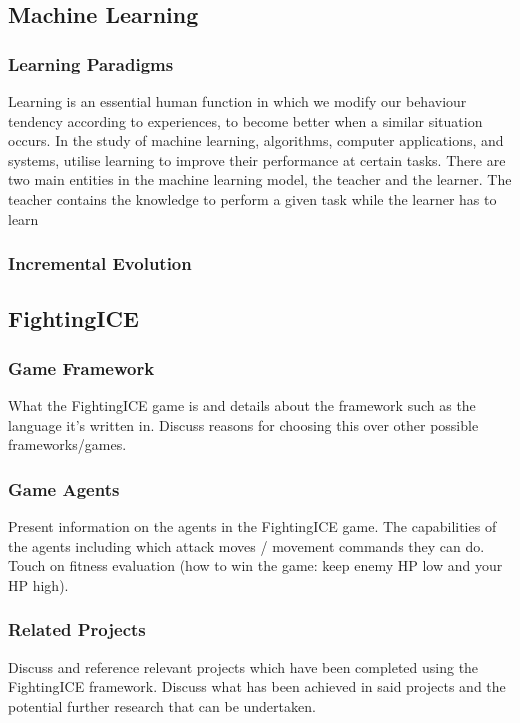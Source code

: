 \documentclass[11pt,a4paper]{article}
\begin{document}
\subsection{Machine Learning}
\subsubsection{Learning Paradigms}
Learning is an essential human function in which we modify our behaviour tendency according to experiences, to become better when a similar situation occurs. In the study of machine learning, algorithms, computer applications, and systems, utilise learning to improve their performance at certain tasks. There are two main entities in the machine learning model, the teacher and the learner. The teacher contains the knowledge to perform a given task while the learner has to learn 

\subsubsection{Incremental Evolution}

\newpage
\subsection{FightingICE}
\subsubsection{Game Framework}
What the FightingICE game is and details about the framework such as the language it's written in. Discuss reasons for choosing this over other possible frameworks/games.

\subsubsection{Game Agents}
Present information on the agents in the FightingICE game. The capabilities of the agents including which attack moves / movement commands they can do. Touch on fitness evaluation (how to win the game: keep enemy HP low and your HP high).

\subsubsection{Related Projects}
Discuss and reference relevant projects which have been completed using the FightingICE framework. Discuss what has been achieved in said projects and the potential further research that can be undertaken.
\end{document}

